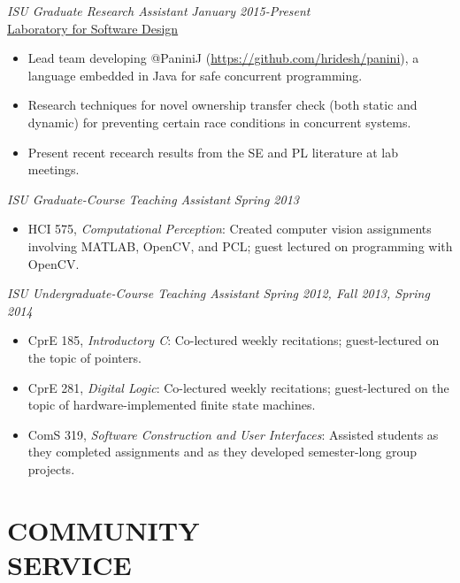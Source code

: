 \documentclass[margin, 10pt]{res} %
\begin{document}
\begin{resume}
{\sl ISU Graduate Research Assistant} \hfill {\sl January 2015-Present} \\
  \href{http://design.cs.iastate.edu/}{Laboratory for Software Design}
  \begin{itemize} \itemsep -1pt %
    \item Lead team developing @PaniniJ (\url{https://github.com/hridesh/panini}),
          a language embedded in Java for safe concurrent programming.
    \item Research techniques for novel ownership transfer check (both static
          and dynamic) for preventing certain race conditions in concurrent
          systems.
    \item Present recent recearch results from the SE and PL literature at
          lab meetings.
  \end{itemize}

{\sl ISU Graduate-Course Teaching Assistant}         \hfill {\sl Spring 2013}
  \begin{itemize} \itemsep -1pt
    \item HCI 575, {\sl Computational Perception}: Created computer vision
          assignments involving MATLAB, OpenCV, and PCL; guest lectured on
          programming with OpenCV.
  \end{itemize}

{\sl ISU Undergraduate-Course Teaching Assistant}    \hfill {\sl Spring 2012,
                                                     Fall 2013, Spring 2014}
  \begin{itemize} \itemsep -1pt
    \item CprE 185, {\sl Introductory C}: Co-lectured weekly recitations;
          guest-lectured on the topic of pointers.
    \item CprE 281, {\sl Digital Logic}: Co-lectured weekly recitations;
          guest-lectured on the topic of hardware-implemented finite state
          machines.
    \item ComS 319, {\sl Software Construction and User Interfaces}: Assisted
          students as they completed assignments and as they developed
          semester-long group projects.
  \end{itemize}



\section{COMMUNITY \\ SERVICE}


\end{resume}
\end{document}
